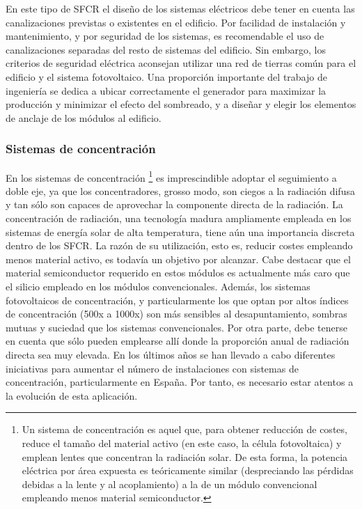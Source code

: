 En este tipo de SFCR el diseño de los sistemas eléctricos debe tener
en cuenta las canalizaciones previstas o existentes en el edificio.
Por facilidad de instalación y mantenimiento, y por seguridad de los
sistemas, es recomendable el uso de canalizaciones separadas del resto
de sistemas del edificio. Sin embargo, los criterios de seguridad
eléctrica aconsejan utilizar una red de tierras común para el edificio
y el sistema fotovoltaico. Una proporción importante del trabajo de
ingeniería se dedica a ubicar correctamente el generador para
maximizar la producción y minimizar el efecto del sombreado, y a
diseñar y elegir los elementos de anclaje de los módulos al edificio.


\subsubsection{Sistemas de concentración}

En los sistemas de concentración%
\footnote{Un sistema de concentración es aquel que, para obtener reducción de
costes, reduce el tamaño del material activo (en este caso, la célula
fotovoltaica) y emplean lentes que concentran la radiación solar.
De esta forma, la potencia eléctrica por área expuesta es teóricamente
similar (despreciando las pérdidas debidas a la lente y al acoplamiento)
a la de un módulo convencional empleando menos material semiconductor.%
} es imprescindible adoptar el seguimiento a doble eje, ya que los
concentradores, grosso modo, son ciegos a la radiación difusa y tan
sólo son capaces de aprovechar la componente directa de la radiación.
La concentración de radiación, una tecnología madura ampliamente empleada
en los sistemas de energía solar de alta temperatura, tiene aún una
importancia discreta dentro de los SFCR. La razón de su utilización,
esto es, reducir costes empleando menos material activo, es todavía
un objetivo por alcanzar. Cabe destacar que el material semiconductor
requerido en estos módulos es actualmente más caro que el silicio
empleado en los módulos convencionales. Además, los sistemas fotovoltaicos
de concentración, y particularmente los que optan por altos índices
de concentración (500x a 1000x) son más sensibles al desapuntamiento,
sombras mutuas y suciedad que los sistemas convencionales. Por otra
parte, debe tenerse en cuenta que sólo pueden emplearse allí donde
la proporción anual de radiación directa sea muy elevada. En los últimos
años se han llevado a cabo diferentes iniciativas para aumentar el
número de instalaciones con sistemas de concentración, particularmente
en España. Por tanto, es necesario estar atentos a la evolución de
esta aplicación.




